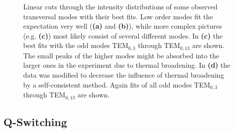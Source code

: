 \documentclass[a4paper]{scrartcl}
\numberwithin{equation}{section}
\numberwithin{figure}{section}
\numberwithin{table}{section}
\begin{document}
\begin{figure}
\begin{tabular}{cc}
\end{tabular}
\caption{\small Linear cuts through the intensity distributions of some observed transversal modes with their best fits. Low order modes fit the expectation very well (\textbf{(a)} and \textbf{(b)}), while more complex pictures (e.g. \textbf{(c)}) most likely consist of several different modes. In \textbf{(c)} the best fits with the odd modes TEM$_{0,3}$ through TEM$_{0,13}$ are shown. The small peaks of the higher modes might be absorbed into the larger ones in the experiment due to thermal broadening. In \textbf{(d)} the data was modified to decrease the influence of thermal broadening by a self-consistent method. Again fits of all odd modes TEM$_{0,3}$ through TEM$_{0,13}$ are shown. }
\label{fig:temGraphs}
\end{figure}



\subsection{Q-Switching}



\clearpage
 

\end{document}
